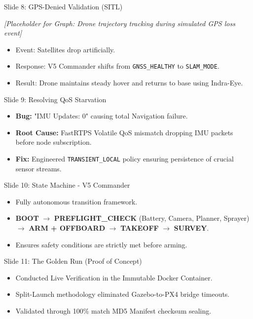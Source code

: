 \documentclass[aspectratio=169, xcolor=table]{beamer}
\begin{document}
\begin{frame}{Slide 8: GPS-Denied Validation (SITL)}
    \begin{center}
        \textit{[Placeholder for Graph: Drone trajectory tracking during simulated GPS loss event]}
    \end{center}
    \begin{itemize}
        \item Event: Satellites drop artificially.
        \item Response: V5 Commander shifts from \texttt{GNSS\_HEALTHY} to \texttt{SLAM\_MODE}.
        \item Result: Drone maintains steady hover and returns to base using Indra-Eye.
    \end{itemize}
\end{frame}

\begin{frame}{Slide 9: Resolving QoS Starvation}
    \begin{itemize}
        \item \textbf{Bug:} "IMU Updates: 0" causing total Navigation failure.
        \item \textbf{Root Cause:} FastRTPS Volatile QoS mismatch dropping IMU packets before node subscription.
        \item \textbf{Fix:} Engineered \texttt{TRANSIENT\_LOCAL} policy ensuring persistence of crucial sensor streams.
    \end{itemize}
\end{frame}

\begin{frame}{Slide 10: State Machine - V5 Commander}
    \begin{itemize}
        \item Fully autonomous transition framework.
        \item \textbf{BOOT} $\rightarrow$ \textbf{PREFLIGHT\_CHECK} (Battery, Camera, Planner, Sprayer) $\rightarrow$ \textbf{ARM + OFFBOARD} $\rightarrow$ \textbf{TAKEOFF} $\rightarrow$ \textbf{SURVEY}.
        \item Ensures safety conditions are strictly met before arming.
    \end{itemize}
\end{frame}

\begin{frame}{Slide 11: The Golden Run (Proof of Concept)}
    \begin{itemize}
        \item Conducted Live Verification in the Immutable Docker Container.
        \item Split-Launch methodology eliminated Gazebo-to-PX4 bridge timeouts.
        \item Validated through 100\% match MD5 Manifest checksum sealing.
    \end{itemize}
\end{frame}
\end{document}
